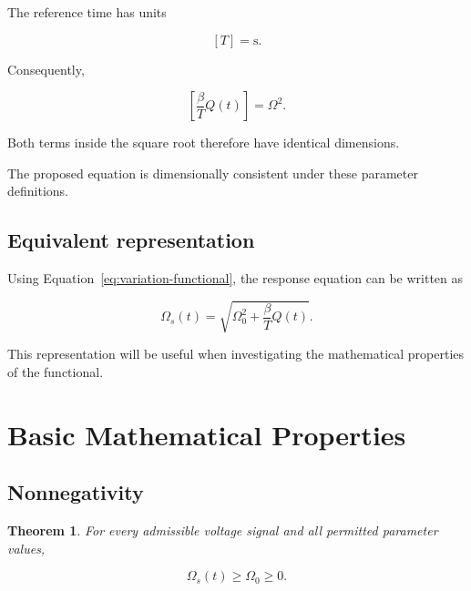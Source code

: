 \documentclass[12pt]{article}
\newtheorem{theorem}{Theorem}[section]
\theoremstyle{definition}
\theoremstyle{remark}
\begin{document}
The reference time has units

\[
[T]=\mathrm{s}.
\]

Consequently,

\[
\left[
\frac{\beta}{T}Q(t)
\right]
=
\Omega^2.
\]

Both terms inside the square root therefore
have identical dimensions.

The proposed equation is dimensionally
consistent under these parameter definitions.

\subsection{Equivalent representation}

Using Equation~\eqref{eq:variation-functional},
the response equation can be written as

\begin{equation}
\Omega_s(t)=
\sqrt{
\Omega_0^2+\frac{\beta}{T}Q(t)
}.
\label{eq:evre-q}
\end{equation}

This representation will be useful when
investigating the mathematical properties
of the functional.

\section{Basic Mathematical Properties}

\subsection{Nonnegativity}

\begin{theorem}

For every admissible voltage signal and
all permitted parameter values,

\begin{equation}
\Omega_s(t)\geq\Omega_0\geq0.
\label{eq:nonnegative}
\end{equation}

\end{theorem}
\end{document}
